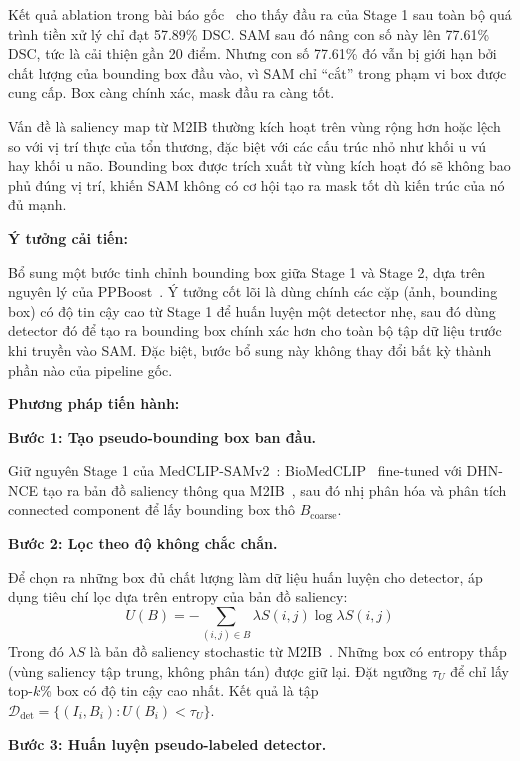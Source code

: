 \documentclass[conference]{IEEEtran}
\begin{document}
Kết quả ablation trong bài báo gốc~\cite{ref1} cho thấy đầu ra của Stage 1 sau toàn bộ quá trình tiền xử lý chỉ đạt 57.89\% DSC. SAM sau đó nâng con số này lên 77.61\% DSC, tức là cải thiện gần 20 điểm. Nhưng con số 77.61\% đó vẫn bị giới hạn bởi chất lượng của bounding box đầu vào, vì SAM chỉ ``cắt'' trong phạm vi box được cung cấp. Box càng chính xác, mask đầu ra càng tốt.

Vấn đề là saliency map từ M2IB thường kích hoạt trên vùng rộng hơn hoặc lệch so với vị trí thực của tổn thương, đặc biệt với các cấu trúc nhỏ như khối u vú hay khối u não. Bounding box được trích xuất từ vùng kích hoạt đó sẽ không bao phủ đúng vị trí, khiến SAM không có cơ hội tạo ra mask tốt dù kiến trúc của nó đủ mạnh.

\textbf{Ý tưởng cải tiến:}

Bổ sung một bước tinh chỉnh bounding box giữa Stage 1 và Stage 2, dựa trên nguyên lý của PPBoost~\cite{ref8}. Ý tưởng cốt lõi là dùng chính các cặp (ảnh, bounding box) có độ tin cậy cao từ Stage 1 để huấn luyện một detector nhẹ, sau đó dùng detector đó để tạo ra bounding box chính xác hơn cho toàn bộ tập dữ liệu trước khi truyền vào SAM. Đặc biệt, bước bổ sung này không thay đổi bất kỳ thành phần nào của pipeline gốc.

\textbf{Phương pháp tiến hành:}

\textbf{Bước 1: Tạo pseudo-bounding box ban đầu.}

Giữ nguyên Stage 1 của MedCLIP-SAMv2~\cite{ref1}: BioMedCLIP~\cite{ref3} fine-tuned với DHN-NCE tạo ra bản đồ saliency thông qua M2IB~\cite{ref7}, sau đó nhị phân hóa và phân tích connected component để lấy bounding box thô $B_{\mathrm{coarse}}$.

\textbf{Bước 2: Lọc theo độ không chắc chắn.}

Để chọn ra những box đủ chất lượng làm dữ liệu huấn luyện cho detector, áp dụng tiêu chí lọc dựa trên entropy của bản đồ saliency:
\begin{equation}
U(B) = -\sum_{(i,j) \in B} \lambda S(i,j) \log \lambda S(i,j)
\label{eq:uncertainty}
\end{equation}
Trong đó $\lambda S$ là bản đồ saliency stochastic từ M2IB~\cite{ref7}. Những box có entropy thấp (vùng saliency tập trung, không phân tán) được giữ lại. Đặt ngưỡng $\tau_U$ để chỉ lấy top-$k$\% box có độ tin cậy cao nhất. Kết quả là tập $\mathcal{D}_{\mathrm{det}} = \{(I_i, B_i) : U(B_i) < \tau_U\}$.

\textbf{Bước 3: Huấn luyện pseudo-labeled detector.}
\end{document}
